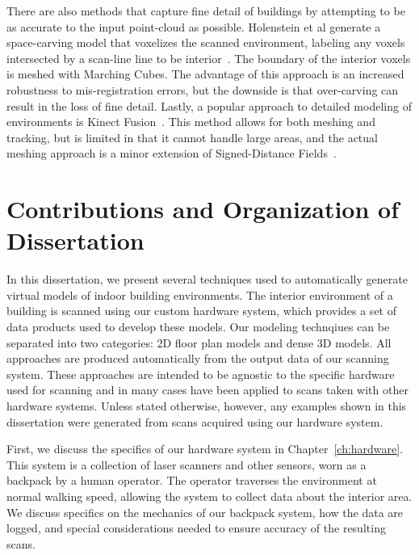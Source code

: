 \documentclass[12pt,onecolumn,oneside]{book}
\begin{document}
There are also methods that capture fine detail of buildings by attempting to be as accurate to the input point-cloud as possible.  Holenstein et al generate a space-carving model that voxelizes the scanned environment, labeling any voxels intersected by a scan-line line to be interior~\cite{Carving}.  The boundary of the interior voxels is meshed with Marching Cubes.  The advantage of this approach is an increased robustness to mis-registration errors, but the downside is that over-carving can result in the loss of fine detail.  Lastly, a popular approach to detailed modeling of environments is Kinect Fusion~\cite{KinectFusion,Kintinuous}.  This method allows for both meshing and tracking, but is limited in that it cannot handle large areas, and the actual meshing approach is a minor extension of Signed-Distance Fields~\cite{SignedDistanceFields}. 

\section{Contributions and Organization of Dissertation}
\label{sec:organization}

In this dissertation, we present several techniques used to automatically generate virtual models of indoor building environments.  The interior environment of a building is scanned using our custom hardware system, which provides a set of data products used to develop these models.  Our modeling technqiues can be separated into two categories:  2D floor plan models and dense 3D models.  All approaches are produced automatically from the output data of our scanning system.  These approaches are intended to be agnostic to the specific hardware used for scanning and in many cases have been applied to scans taken with other hardware systems.  Unless stated otherwise, however, any examples shown in this dissertation were generated from scans acquired using our hardware system.

First, we discuss the specifics of our hardware system in Chapter~\ref{ch:hardware}.  This system is a collection of laser scanners and other sensors, worn as a backpack by a human operator.  The operator traverses the environment at normal walking speed, allowing the system to collect data about the interior area.  We discuss specifics on the mechanics of our backpack system, how the data are logged, and special considerations needed to ensure accuracy of the resulting scans.
\end{document}
